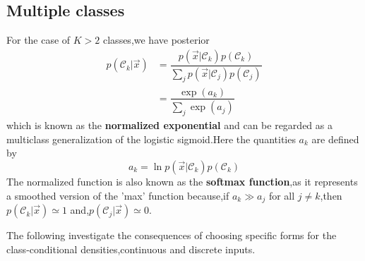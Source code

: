 \subsection{Multiple classes}
For the case of $K>2$ classes,we have posterior
\begin{align}
p(\mathcal{C}_k|\vec{x}) 
&=\dfrac{p(\vec{x}|\mathcal{C}_k)p(\mathcal{C}_k)}{\sum_{j}{p(\vec{x}|\mathcal{C}_j)p(\mathcal{C}_j)}} \\
&=\dfrac{\exp(a_k)}{\sum_j\exp(a_j)}
\end{align}
which is known as the \textbf{normalized exponential} and can be regarded as a multiclass generalization of the logistic sigmoid.Here the quantities $a_k$ are defined by
\begin{equation}
a_k=\ln p(\vec{x}|\mathcal{C}_k)p(\mathcal{C}_k)
\end{equation}
The normalized function is also known as the \textbf{softmax function},as it represents a smoothed version of the 'max' function because,if $a_k \gg a_j$ for all $j\neq k$,then $p(\mathcal{C}_k|\vec{x}) \simeq 1$ and,$p(\mathcal{C}_j|\vec{x}) \simeq 0$.


The following investigate the consequences of choosing specific forms for the class-conditional densities,continuous and discrete inputs.
